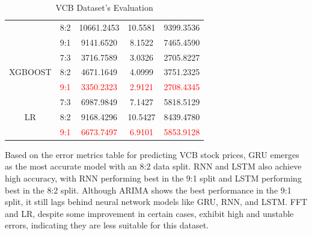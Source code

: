 \documentclass{ieeeojies}
\begin{document}
\begin{table}[H]
\begin{tabular}{|c|c|c|c|c|}
        & 8:2 & 10661.2453 & 10.5581 & 9399.3536 \\
       
        & 9:1 & 9141.6520 & 8.1522 & 7465.4590 \\
         \hline
        \multirow{3}{*}{XGBOOST} 
        & 7:3 & 3716.7589 & 3.0326 & 2705.8227 \\
        & 8:2 & 4671.1649 & 4.0999 & 3751.2325 \\
        & \textcolor{red}{9:1} & \textcolor{red}{3350.2323} & \textcolor{red}{2.9121} & \textcolor{red}{2708.4345} \\
        \hline
        \multirow{3}{*}{LR} 
        & 7:3 & 6987.9849 & 7.1427 & 5818.5129 \\
        & 8:2 & 9168.4296 & 10.5427 & 8439.4780 \\
        & \textcolor{red}{9:1} & \textcolor{red}{6673.7497} & \textcolor{red}{6.9101} & \textcolor{red}{5853.9128} \\
        \hline
    \end{tabular}
    \caption{VCB Dataset's Evaluation}
    \label{vcbdataset}
\end{table}
Based on the error metrics table for predicting VCB stock prices, GRU emerges as the most accurate model with an 8:2 data split. RNN and LSTM also achieve high accuracy, with RNN performing best in the 9:1 split and LSTM performing best in the 8:2 split. Although ARIMA shows the best performance in the 9:1 split, it still lags behind neural network models like GRU, RNN, and LSTM. FFT and LR, despite some improvement in certain cases, exhibit high and unstable errors, indicating they are less suitable for this dataset.
\end{document}
